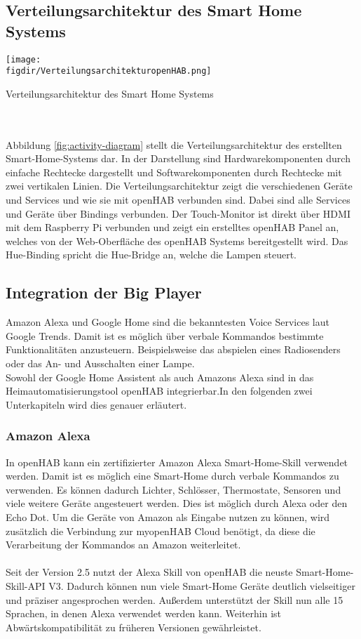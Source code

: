 		
		\subsection{Verteilungsarchitektur des Smart Home Systems}
		
		\smallskip
\begin{minipage}{\textwidth}
	\centering
	\captionsetup{type=figure}
	\texttt{[image: \\figdir/VerteilungsarchitekturopenHAB.png]}
	\caption{Verteilungsarchitektur des Smart Home Systems \label{fig:activity-diagram}}
\end{minipage}
\\
\\
	Abbildung \ref{fig:activity-diagram} stellt die Verteilungsarchitektur des erstellten Smart-Home-Systems dar. In der Darstellung sind Hardwarekomponenten durch einfache Rechtecke dargestellt und Softwarekomponenten durch Rechtecke mit zwei vertikalen Linien. Die Verteilungsarchitektur zeigt die verschiedenen Geräte und Services und wie sie mit openHAB verbunden sind. Dabei sind alle Services und Geräte über Bindings verbunden. Der Touch-Monitor ist direkt über HDMI mit dem Raspberry Pi verbunden und zeigt ein erstelltes openHAB Panel an, welches von der Web-Oberfläche des openHAB Systems bereitgestellt wird. Das Hue-Binding spricht die Hue-Bridge an, welche die Lampen steuert.
	
\subsection{Integration der Big Player}
Amazon Alexa und Google Home sind die bekanntesten Voice Services laut Google Trends. \cite{GOOGLET01:AG} Damit ist es möglich über verbale Kommandos bestimmte Funktionalitäten anzusteuern. Beispielsweise das abspielen eines Radiosenders oder das An- und Ausschalten einer Lampe.\\
Sowohl der Google Home Assistent als auch Amazons Alexa sind in das Heimautomatisierungstool openHAB integrierbar.In den folgenden zwei Unterkapiteln wird dies genauer erläutert.\cite{openHAB02:OH}

\subsubsection{Amazon Alexa}
In openHAB kann ein zertifizierter Amazon Alexa Smart-Home-Skill verwendet werden. Damit ist es möglich eine Smart-Home durch verbale Kommandos zu verwenden. Es können dadurch Lichter, Schlösser, Thermostate, Sensoren und viele weitere Geräte angesteuert werden. Dies ist möglich durch Alexa oder den Echo Dot.\cite{ALEXA01:AL}\cite{ALEXA02:AL}
Um die Geräte von Amazon als Eingabe nutzen zu können, wird zusätzlich die Verbindung zur myopenHAB Cloud benötigt, da diese die Verarbeitung der Kommandos an Amazon weiterleitet.\\
\\
Seit der Version 2.5 nutzt der Alexa Skill von openHAB die neuste Smart-Home-Skill-API V3. Dadurch können nun viele Smart-Home Geräte deutlich vielseitiger und präziser angesprochen werden. Außerdem unterstützt der Skill nun alle 15 Sprachen, in denen Alexa verwendet werden kann. Weiterhin ist Abwärtskompatibilität zu früheren Versionen gewährleistet.\cite{openHAB02:OH}

